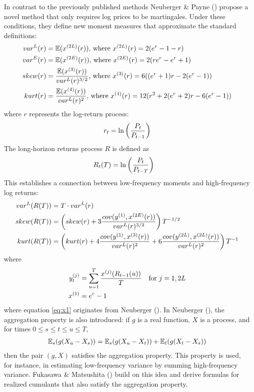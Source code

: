 In contrast to the previously published methods Neuberger \& Payne (\citeyear{neubergerSkewnessStockMarket2021}) propose a novel method that only requires log prices to be martingales. Under these conditions, they define new moment measures that approximate the standard definitions:
\begin{align}
    var^L(r) &= \mathbb{E}(x^{(2L)}(r))\text{, where } x^{(2L)}(r) = 2(e^r-1-r) \notag \\
    var^E(r) &= \mathbb{E}(x^{(2E)}(r))\text{, where } x^{(2E)}(r) = 2(re^r-e^r+1) \notag \\
    skew(r) &= \frac{\mathbb{E}(x^{(3)}(r))}{var^L(r)^{3/2}}\text{, where } x^{(3)}(r) = 6((e^r+1)r - 2(e^r-1)) \notag \\
    kurt(r) &= \frac{\mathbb{E}(x^{(4)}(r))}{var^L(r)^2}\text{, where } x^{(4)}(r) = 12(r^2 + 2(e^r+2)r - 6(e^r-1)) \notag
\end{align}
where $r$ represents the log-return process:
\begin{align}
    r_t = \ln\left(\frac{P_t}{P_{t-1}}\right) \notag
\end{align}
The long-horizon returns process $R$ is defined as
\begin{align}
    R_t(T) &= \ln\left(\frac{P_t}{P_{t-T}}\right) \notag
\end{align}
This establishes a connection between low-frequency moments and high-frequency log returns:
\begin{align}
    var^L(R(T)) &= T\cdot var^L(r) \notag \\
    skew(R(T)) &= \left(skew(r) + 3\frac{cov(y^{(1)}, x^{(2E)}(r))}{var^L(r)^{3/2}}\right)T^{-1/2} \notag \\
    kurt(R(T)) &= \left(kurt(r) + 4\frac{cov(y^{(1)}, x^{(3)}(r))}{var^L(r)^2} + 6\frac{cov(y^{(2L)}, x^{(2L)}(r))}{var^L(r)^2}\right)T^{-1} \notag
\end{align}
where
\begin{align}
    y_t^{(j)} &= \sum_{u=1}^T \frac{x^{(j)}(R_{t-1}(u))}{T} \quad\text{for } j = 1,2L\notag \\
    \label{eq:x1}
    x^{(1)} &= e^r-1
\end{align}
where equation \eqref{eq:x1} originates from Neuberger (\citeyear{neubergerRealizedSkewness2012}). In Neuberger (\citeyear{neubergerRealizedSkewness2012}), the aggregation property is also introduced: if $g$ is a real function, $X$ is a process, and for times $0\le s\le t\le u\le T$,
\begin{align}
    \mathbb{E}_s(g(X_u-X_s)) = \mathbb{E}_s(g(X_u-X_t)) + \mathbb{E}_t(g(X_t-X_s))\notag
\end{align}
then the pair $(g,X)$ satisfies the aggregation property. This property is used, for instance, in estimating low-frequency variance by summing high-frequency variance. Fukasawa \& Matsushita (\citeyear{fukasawaRealizedCumulantsMartingales2021}) build on this idea and derive formulas for realized cumulants that also satisfy the aggregation property.

